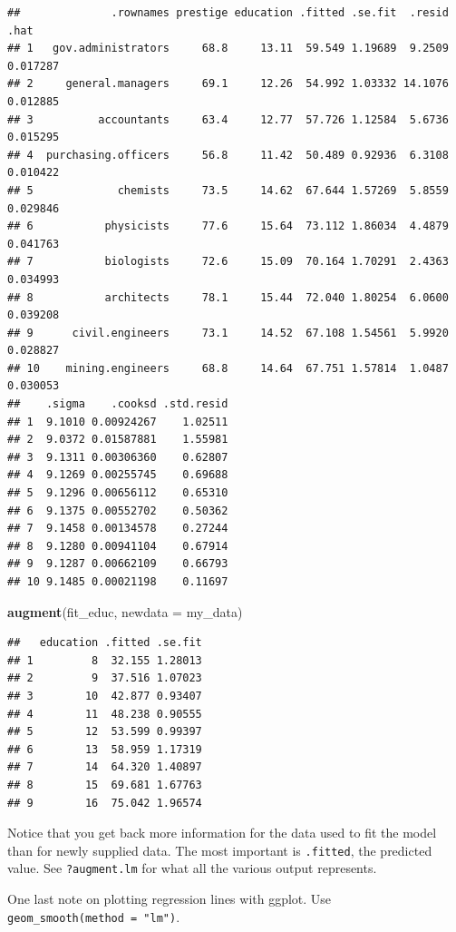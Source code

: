 \documentclass[12pt,oneside,openany]{book}
\newenvironment{Shaded}{\begin{snugshade}}{\end{snugshade}}
\newcommand{\KeywordTok}[1]{\textcolor[rgb]{0.13,0.29,0.53}{\textbf{#1}}}
\newcommand{\DataTypeTok}[1]{\textcolor[rgb]{0.13,0.29,0.53}{#1}}
\newcommand{\NormalTok}[1]{#1}
\begin{document}
\begin{verbatim}
##              .rownames prestige education .fitted .se.fit  .resid     .hat
## 1   gov.administrators     68.8     13.11  59.549 1.19689  9.2509 0.017287
## 2     general.managers     69.1     12.26  54.992 1.03332 14.1076 0.012885
## 3          accountants     63.4     12.77  57.726 1.12584  5.6736 0.015295
## 4  purchasing.officers     56.8     11.42  50.489 0.92936  6.3108 0.010422
## 5             chemists     73.5     14.62  67.644 1.57269  5.8559 0.029846
## 6           physicists     77.6     15.64  73.112 1.86034  4.4879 0.041763
## 7           biologists     72.6     15.09  70.164 1.70291  2.4363 0.034993
## 8           architects     78.1     15.44  72.040 1.80254  6.0600 0.039208
## 9      civil.engineers     73.1     14.52  67.108 1.54561  5.9920 0.028827
## 10    mining.engineers     68.8     14.64  67.751 1.57814  1.0487 0.030053
##    .sigma    .cooksd .std.resid
## 1  9.1010 0.00924267    1.02511
## 2  9.0372 0.01587881    1.55981
## 3  9.1311 0.00306360    0.62807
## 4  9.1269 0.00255745    0.69688
## 5  9.1296 0.00656112    0.65310
## 6  9.1375 0.00552702    0.50362
## 7  9.1458 0.00134578    0.27244
## 8  9.1280 0.00941104    0.67914
## 9  9.1287 0.00662109    0.66793
## 10 9.1485 0.00021198    0.11697
\end{verbatim}

\begin{Shaded}
\begin{Highlighting}[]
\KeywordTok{augment}\NormalTok{(fit_educ,}
        \DataTypeTok{newdata =}\NormalTok{ my_data)}
\end{Highlighting}
\end{Shaded}

\begin{verbatim}
##   education .fitted .se.fit
## 1         8  32.155 1.28013
## 2         9  37.516 1.07023
## 3        10  42.877 0.93407
## 4        11  48.238 0.90555
## 5        12  53.599 0.99397
## 6        13  58.959 1.17319
## 7        14  64.320 1.40897
## 8        15  69.681 1.67763
## 9        16  75.042 1.96574
\end{verbatim}

Notice that you get back more information for the data used to fit the
model than for newly supplied data. The most important is
\texttt{.fitted}, the predicted value. See \texttt{?augment.lm} for what
all the various output represents.

One last note on plotting regression lines with ggplot. Use
\texttt{geom\_smooth(method\ =\ "lm")}.
\end{document}
